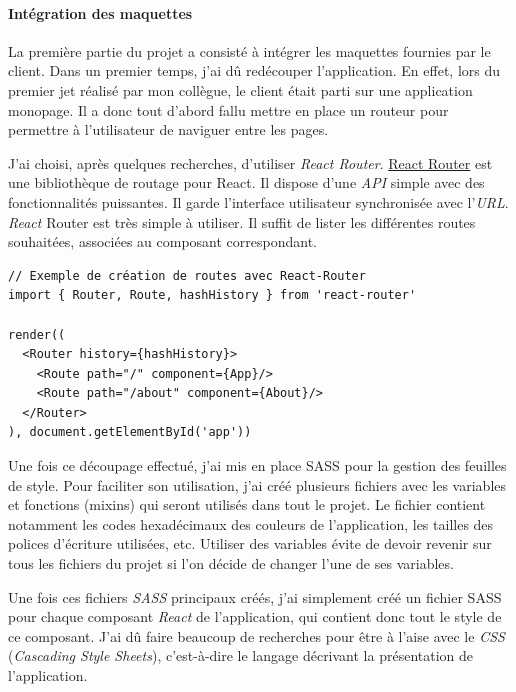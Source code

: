 \bigskip

\paragraph{Intégration des
maquettes}\label{intuxe9gration-des-maquettes}

\bigskip

La première partie du projet a consisté à intégrer les maquettes
fournies par le client. Dans un premier temps, j'ai dû redécouper
l'application. En effet, lors du premier jet réalisé par mon collègue,
le client était parti sur une application monopage. Il a donc tout
d'abord fallu mettre en place un routeur pour permettre à l'utilisateur
de naviguer entre les pages.

\bigskip

J'ai choisi, après quelques recherches, d'utiliser \emph{React Router}.
\href{https://github.com/ReactTraining/react-router}{React Router} est
une bibliothèque de routage pour React. Il dispose d'une \emph{API}
simple avec des fonctionnalités puissantes. Il garde l'interface
utilisateur synchronisée avec l'\emph{URL}. \emph{React} Router est très
simple à utiliser. Il suffit de lister les différentes routes
souhaitées, associées au composant correspondant.

\begin{verbatim}
// Exemple de création de routes avec React-Router
import { Router, Route, hashHistory } from 'react-router'

render((
  <Router history={hashHistory}>
    <Route path="/" component={App}/>
    <Route path="/about" component={About}/>
  </Router>
), document.getElementById('app'))
\end{verbatim}

\bigskip

Une fois ce découpage effectué, j'ai mis en place SASS pour la gestion
des feuilles de style. Pour faciliter son utilisation, j'ai créé
plusieurs fichiers avec les variables et fonctions (mixins) qui seront
utilisés dans tout le projet. Le fichier contient notamment les codes
hexadécimaux des couleurs de l'application, les tailles des polices
d'écriture utilisées, etc. Utiliser des variables évite de devoir
revenir sur tous les fichiers du projet si l'on décide de changer l'une
de ses variables.

\bigskip

Une fois ces fichiers \emph{SASS} principaux créés, j'ai simplement créé
un fichier SASS pour chaque composant \emph{React} de l'application, qui
contient donc tout le style de ce composant. J'ai dû faire beaucoup de
recherches pour être à l'aise avec le \emph{CSS} (\emph{Cascading Style
Sheets}), c'est-à-dire le langage décrivant la présentation de
l'application.

